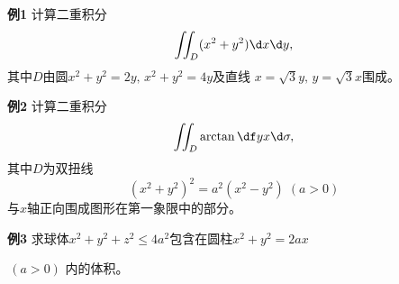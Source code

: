 \begin{frame}
	\linespread{1.2}
	\begin{exampleblock}{{\bf 例1}\hfill}
		计算二重积分
		$$\iint_D(x^2+y^2)\d x\d y,$$
		其中$D$由圆$x^2+y^2=2y,\,x^2+y^2=4y$及直线
		$x=\sqrt 3y,\,y=\sqrt 3x$围成。
	\end{exampleblock}
\end{frame}

\begin{frame}
	\linespread{1.2}
	\begin{exampleblock}{{\bf 例2}\hfill}
		计算二重积分
		$$\iint_D\arctan\df yx\d\sigma,$$
		其中$D$为双扭线
		$$(x^2+y^2)^2=a^2(x^2-y^2)\;(a>0)$$
		与$x$轴正向围成图形在第一象限中的部分。
	\end{exampleblock}
\end{frame}

\begin{frame}
	\linespread{1.2}
	\begin{exampleblock}{{\bf 例3}\hfill}
		求球体$x^2+y^2+z^2\leq 4a^2$包含在圆柱$x^2+y^2=2ax$
		
		$\,(a>0)$
		内的体积。
	\end{exampleblock}
	\pause 
	\begin{center}
	\end{center}
\end{frame}

